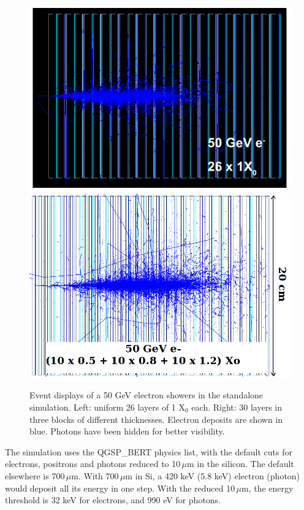 \begin{figure}[h!]
  \begin{center}
    \includegraphics[width=\cmsFigWidth]{figures/e_50GeV_uniform_26x0.png}
    \includegraphics[width=\cmsFigWidth]{figures/e_50GeV_concept_v3.png}
    \caption{Event displays of a 50 GeV electron showers in the
      standalone simulation. Left: uniform 26 layers of 1 X$_0$
      each. Right: 30 layers in three blocks of different
      thicknesses. Electron deposits are shown in blue. Photons have
      been hidden for better visibility.}
    \label{fig:g4vis}
  \end{center}
\end{figure}

The simulation uses the QGSP\_BERT physics list, with the default cuts
for electrons, positrons and photons reduced to 10\,$\mu$m in the
silicon. The default elsewhere is 700\,$\mu$m. With 700\,$\mu$m in Si,
a 420 keV (5.8 keV) electron (photon) would deposit all its energy in
one step. With the reduced 10\,$\mu$m, the energy threshold is 32 keV
for electrons, and 990 eV for photons.

